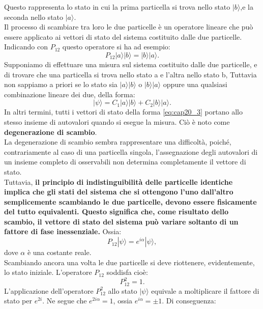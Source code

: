 Questo rappresenta lo stato in cui la prima particella si trova nello stato $|b\rangle$,e la seconda nello stato $|a\rangle$.\\
Il processo di scambiare tra loro le due particelle è un operatore lineare che può essere applicato ai vettori di stato del sistema costituito dalle due particelle. Indicando con $P_{12}$ questo operatore si ha ad esempio:
\begin{equation}
P_{12}|a\rangle|b\rangle = |b\rangle|a\rangle.
\end{equation}
Supponiamo di effettuare una misura sul sistema costituito dalle due particelle, e di trovare che una particella si trova nello stato a e l'altra nello stato b, Tuttavia non sappiamo a priori se lo stato sia $|a\rangle|b\rangle$ o $|b\rangle|a\rangle$ oppure una qualsiasi combinazione lineare dei due, della forma:
\begin{equation}
|\psi\rangle = C_1|a\rangle|b\rangle + C_2 |b\rangle|a\rangle.
\label{eq:cap20_3}
\end{equation}
In altri termini, tutti i vettori di stato della forma \ref{eq:cap20_3} portano allo stesso insieme di autovalori quando si esegue la misura. Ciò è noto come \textbf{degenerazione di scambio}.\\
La degenerazione di scambio sembra rappresentare una difficoltà, poiché, contrariamente al caso di una particella singola, l'assegnazione degli autovalori di un insieme completo di osservabili non determina completamente il vettore di stato.\\
Tuttavia, \textbf{il principio di indistinguibilità delle particelle identiche implica che gli stati del sistema che si ottengono l'uno dall'altro semplicemente scambiando le due particelle, devono essere fisicamente del tutto equivalenti. Questo significa che, come risultato dello scambio, il vettore di stato del sistema può variare soltanto di un fattore di fase inessenziale.} Ossia:
\begin{equation}
P_{12}|\psi\rangle =  e^{i\alpha}|\psi\rangle,
\end{equation}
dove $\alpha$ è una costante reale.\\
Scambiando ancora una volta le due particelle si deve riottenere, evidentemente, lo stato iniziale. L'operatore $P_{12}$ soddisfa cioè:\\
\begin{equation}
P_{12}^2 = 1.
\end{equation}
L'applicazione dell'operatore $P_{12}^2$ allo stato $|\psi\rangle$ equivale a moltiplicare il fattore di stato per $e^{2i}$. Ne segue che $e^{2i\alpha} = 1 $, ossia $e^{i\alpha}=\pm1$. Di conseguenza:
